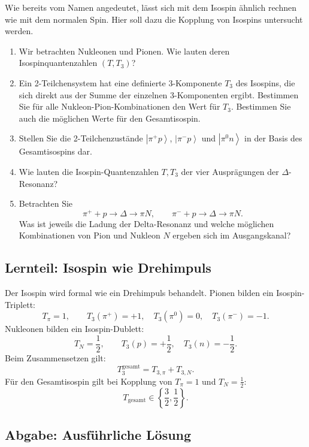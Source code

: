 \documentclass[11pt,a4paper]{scrartcl}
\newcommand{\ket}[1]{\left| #1 \right\rangle}
\theoremstyle{definition}
\theoremstyle{plain}
\theoremstyle{remark}
\begin{document}
\begin{taskbox}
Wie bereits vom Namen angedeutet, lässt sich mit dem Isospin ähnlich rechnen wie mit dem normalen Spin. Hier soll dazu die Kopplung von Isospins untersucht werden.

\begin{enumerate}[label=(\alph*)]
    \item Wir betrachten Nukleonen und Pionen. Wie lauten deren Isospinquantenzahlen $(T,T_3)$?
    \item Ein 2-Teilchensystem hat eine definierte 3-Komponente $T_3$ des Isospins, die sich direkt aus der Summe der einzelnen 3-Komponenten ergibt. Bestimmen Sie für alle Nukleon-Pion-Kombinationen den Wert für $T_3$. Bestimmen Sie auch die möglichen Werte für den Gesamtisospin.
    \item Stellen Sie die 2-Teilchenzustände $\ket{\pi^+p}$, $\ket{\pi^-p}$ und $\ket{\pi^0n}$ in der Basis des Gesamtisospins dar.
    \item Wie lauten die Isospin-Quantenzahlen $T,T_3$ der vier Ausprägungen der $\Delta$-Resonanz?
    \item Betrachten Sie
    \[
        \pi^+ + p \to \Delta \to \pi N,
        \qquad
        \pi^- + p \to \Delta \to \pi N.
    \]
    Was ist jeweils die Ladung der Delta-Resonanz und welche möglichen Kombinationen von Pion und Nukleon $N$ ergeben sich im Ausgangskanal?
\end{enumerate}
\end{taskbox}

\subsection{Lernteil: Isospin wie Drehimpuls}

\begin{learningbox}
Der Isospin wird formal wie ein Drehimpuls behandelt. Pionen bilden ein Isospin-Triplett:
\[
    T_\pi=1,
    \qquad
    T_3(\pi^+)=+1,\quad T_3(\pi^0)=0,\quad T_3(\pi^-)=-1.
\]
Nukleonen bilden ein Isospin-Dublett:
\[
    T_N=\frac{1}{2},
    \qquad
    T_3(p)=+\frac{1}{2},
    \quad
    T_3(n)=-\frac{1}{2}.
\]
Beim Zusammensetzen gilt:
\[
    T_3^{\mathrm{gesamt}}=T_{3,\pi}+T_{3,N}.
\]
Für den Gesamtisospin gilt bei Kopplung von $T_\pi=1$ und $T_N=\frac12$:
\[
    T_{\mathrm{gesamt}}\in
    \left\{
    \frac{3}{2},
    \frac{1}{2}
    \right\}.
\]
\end{learningbox}

\subsection{Abgabe: Ausf\"uhrliche L\"osung}
\end{document}
